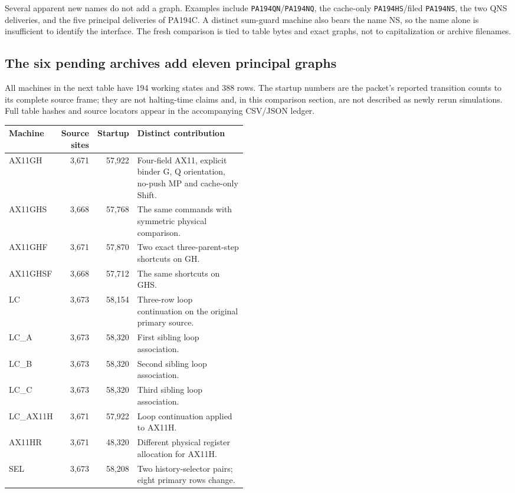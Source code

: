 Several apparent new names do not add a graph. Examples include
\texttt{PA194QN}/\texttt{PA194NQ}, the cache-only
\texttt{PA194HS}/filed \texttt{PA194NS}, the two QNS deliveries,
and the five principal deliveries of PA194C. A distinct sum-guard machine
also bears the name NS, so the name alone is insufficient to identify the
interface. The fresh comparison is tied to table bytes and exact graphs,
not to capitalization or archive filenames.

\subsection{The six pending archives add eleven principal graphs}

All machines in the next table have 194 working states and 388 rows. The
startup numbers are the packet's reported transition counts to its complete
source frame; they are not halting-time claims and, in this comparison
section, are not described as newly rerun simulations. Full table hashes
and source locators appear in the accompanying CSV/JSON ledger.

\begin{center}
\small
\begin{tabular}{lrrp{0.47\linewidth}}
\toprule
Machine & Source sites & Startup & Distinct contribution\\
\midrule
AX11GH & 3,671 & 57,922 & Four-field AX11, explicit binder G, Q orientation,
no-push MP and cache-only Shift.\\
AX11GHS & 3,668 & 57,768 & The same commands with symmetric physical comparison.\\
AX11GHF & 3,671 & 57,870 & Two exact three-parent-step shortcuts on GH.\\
AX11GHSF & 3,668 & 57,712 & The same shortcuts on GHS.\\
LC & 3,673 & 58,154 & Three-row loop continuation on the original primary source.\\
LC\_A & 3,673 & 58,320 & First sibling loop association.\\
LC\_B & 3,673 & 58,320 & Second sibling loop association.\\
LC\_C & 3,673 & 58,320 & Third sibling loop association.\\
LC\_AX11H & 3,671 & 57,922 & Loop continuation applied to AX11H.\\
AX11HR & 3,671 & 48,320 & Different physical register allocation for AX11H.\\
SEL & 3,673 & 58,208 & Two history-selector pairs; eight primary rows change.\\
\bottomrule
\end{tabular}
\end{center}

